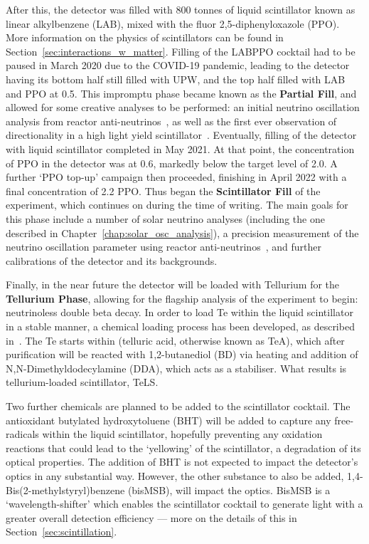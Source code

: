 After this, the detector was filled with 800 tonnes of liquid scintillator known as linear alkylbenzene (LAB), mixed with the fluor 2,5-diphenyloxazole (PPO). More information on the physics of scintillators can be found in Section~\ref{sec:interactions_w_matter}. Filling of the LABPPO cocktail had to be paused in March 2020 due to the COVID-19 pandemic, leading to the detector having its bottom half still filled with UPW, and the top half filled with LAB and PPO at \SI{0.5}{\gpl}. This impromptu phase became known as the \textbf{Partial Fill}, and allowed for some creative analyses to be performed: an initial neutrino oscillation analysis from reactor anti-neutrinos~\cite{}, %
as well as the first ever observation of directionality in a high light yield scintillator~\cite{}. %
Eventually, filling of the detector with liquid scintillator completed in May 2021. At that point, the concentration of PPO in the detector was at \SI{0.6}{\gpl}, markedly below the target level of \SI{2.0}{\gpl}. A further `PPO top-up' campaign then proceeded, finishing in April 2022 with a final concentration of \SI{2.2}{\gpl} PPO. Thus began the \textbf{Scintillator Fill} of the experiment, which continues on during the time of writing. The main goals for this phase include a number of solar neutrino analyses (including the one described in Chapter~\ref{chap:solar_osc_analysis}), a precision measurement of the neutrino oscillation parameter \dmsq{} using reactor anti-neutrinos~\cite{morton-blakeFirstMeasurementReactor2021}, %
and further calibrations of the detector and its backgrounds.

Finally, in the near future the detector will be loaded with Tellurium for the \textbf{Tellurium Phase}, allowing for the flagship analysis of the experiment to begin: neutrinoless double beta decay. In order to load Te within the liquid scintillator in a stable manner, a chemical loading process has been developed, as described in~\cite{}. %
The Te starts within  (telluric acid, otherwise known as TeA), which after purification will be reacted with 1,2-butanediol (BD) via heating and addition of N,N-Dimethyldodecylamine (DDA), which acts as a stabiliser. What results is tellurium-loaded scintillator, TeLS.

Two further chemicals are planned to be added to the scintillator cocktail. The antioxidant butylated hydroxytoluene (BHT) will be added to capture any free-radicals within the liquid scintillator, hopefully preventing any oxidation reactions that could lead to the `yellowing' of the scintillator, a degradation of its optical properties. The addition of BHT is not expected to impact the detector's optics in any substantial way. However, the other substance to also be added, 1,4-Bis(2-methylstyryl)benzene (bisMSB), will impact the optics. BisMSB is a `wavelength-shifter' which enables the scintillator cocktail to generate light with a greater overall detection efficiency --- more on the details of this in Section~\ref{sec:scintillation}.

